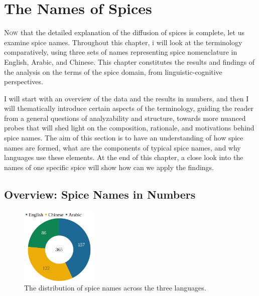 \chapter{The Names of Spices}
\label{ch:names}



\lettrine[lines=\iniciale]{\textcolor{\accentcolor}{N}}{ow} that the detailed explanation of the diffusion of spices is complete, let us examine spice names. Throughout this chapter, i will look at the terminology comparatively, using three sets of names representing spice nomenclature in English, Arabic, and Chinese. This chapter constitutes the results and findings of the analysis on the terms of the spice domain, from linguistic-cognitive perspectives. 

I will start with an overview of the data and the results in numbers, and then I will thematically introduce certain aspects of the terminology, guiding the reader from a general questions of analyzability and structure, towards more nuanced probes that will shed light on the composition, rationale, and motivations behind spice names. The aim of this section is to have an understanding of how spice names are formed, what are the components of typical spice names, and why languages use these elements. At the end of this chapter, a close look into the names of one specific spice will show how can we apply the findings. 

\section{Overview: Spice Names in Numbers}

\begin{figure}
  \vspace{-\baselineskip}
  \includegraphics[width=0.33\textwidth]{imgs/plots/languages_pie.pdf}
  \caption{The distribution of spice names across the three languages.}
  \label{fig:languages_pie}
\end{figure}

